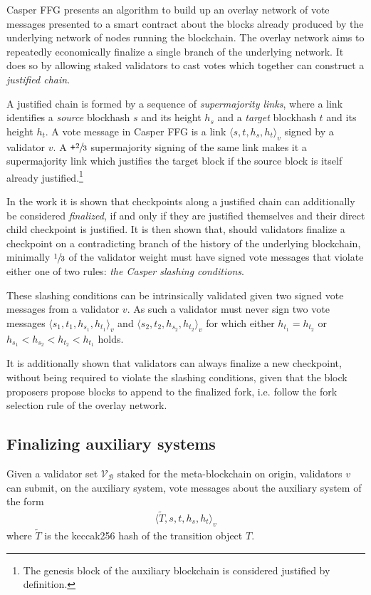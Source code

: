 \documentclass[12pt,a4paper]{article}
\begin{document}
Casper FFG presents an algorithm to build up an overlay network of vote messages presented to a smart contract about the blocks already produced by the underlying network of nodes running the blockchain.
The overlay network aims to repeatedly economically finalize a single branch of the underlying network.
It does so by allowing staked validators to cast votes which together can construct a \emph{justified chain}.

A justified chain is formed by a sequence of \emph{supermajority links}, where a link identifies a \emph{source} blockhash $s$ and its height $h_s$ and a \emph{target} blockhash $t$ and its height $h_t$.
A vote message in Casper FFG is a link $\langle s, t, h_s, h_t\rangle_v$ signed by a validator $v$.
A $\texttt{+}\sfrac{2}{3}$ supermajority signing of the same link makes it a supermajority link which justifies the target block if the source block is itself already justified.\footnote{
	The genesis block of the auxiliary blockchain is considered justified by definition.
}

In the work it is shown that checkpoints along a justified chain can additionally be considered \emph{finalized}, if and only if they are justified themselves and their direct child checkpoint is justified.
It is then shown that, should validators finalize a checkpoint on a contradicting branch of the history of the underlying blockchain, minimally $\sfrac{1}{3}$ of the validator weight must have signed vote messages that violate either one of two rules: \emph{the Casper slashing conditions}.

These slashing conditions can be intrinsically validated given two signed vote messages from a validator $v$.
As such a validator must never sign two vote messages $\langle s_1, t_1, h_{s_1}, h_{t_1}\rangle_v$ and $\langle s_2, t_2, h_{s_2}, h_{t_2}\rangle_v$ for which either $h_{t_1} = h_{t_2}$ or $h_{s_1} < h_{s_2} < h_{t_2} < h_{t_1}$ holds.

It is additionally shown that validators can always finalize a new checkpoint, without being required to violate the slashing conditions, given that the block proposers propose blocks to append to the finalized fork, i.e. follow the fork selection rule of the overlay network.

\subsection{Finalizing auxiliary systems}
Given a validator set $\mathcal{V}_\mathcal{B}$ staked for the meta-blockchain on origin, validators $v$ can submit, on the auxiliary system, vote messages about the auxiliary system of the form
\begin{align}\label{externalizedvote}
  \langle \tilde{T}, s, t, h_s, h_t \rangle_v
\end{align}
where $\tilde{T}$ is the keccak256 hash of the transition object $T$.
\end{document}
